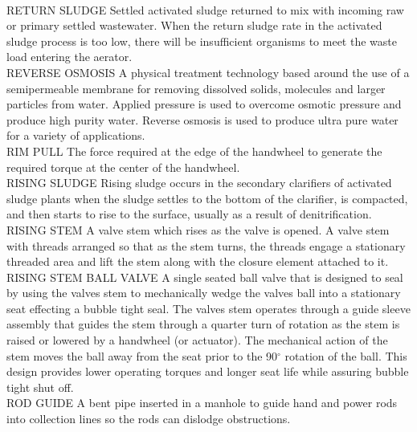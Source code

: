\vspace{0.3cm}\\
RETURN SLUDGE
Settled activated sludge returned to mix with incoming raw or primary settled wastewater. When the return sludge rate in the activated sludge process is too low, there will be insufficient organisms to meet the waste load entering the aerator.
\vspace{0.3cm}\\
REVERSE OSMOSIS
A physical treatment technology based around the use of a semipermeable membrane for removing dissolved solids, molecules and larger particles from water. Applied pressure is used to overcome osmotic pressure and produce high purity water. Reverse osmosis is used to produce ultra pure water for a variety of applications.
\vspace{0.3cm}\\
RIM PULL
The force required at the edge of the handwheel to generate the required torque at the center of the handwheel.
\vspace{0.3cm}\\
RISING SLUDGE
Rising sludge occurs in the secondary clarifiers of activated sludge plants when the sludge settles to the bottom of the clarifier, is compacted, and then starts to rise to the surface, usually as a result of denitrification.
\vspace{0.3cm}\\
RISING STEM
A valve stem which rises as the valve is opened.  A valve stem with threads arranged so that as the stem turns, the threads engage a stationary threaded area and lift the stem along with the closure element attached to it.
\vspace{0.3cm}\\
RISING STEM BALL VALVE
A single seated ball valve that is designed to seal by using the valves stem to mechanically wedge the valves ball into a stationary seat effecting a bubble tight seal. The valves stem operates through a guide sleeve assembly that guides the stem through a quarter turn of rotation as the stem is raised or lowered by a handwheel (or actuator). The mechanical action of the stem moves the ball away from the seat prior to the 90$^{\circ}$ rotation of the ball. This design provides lower operating torques and longer seat life while assuring bubble tight shut off.
\vspace{0.3cm}\\
ROD GUIDE
A bent pipe inserted in a manhole to guide hand and power rods into collection lines so the rods can dislodge obstructions. 
\vspace{0.3cm}\\
